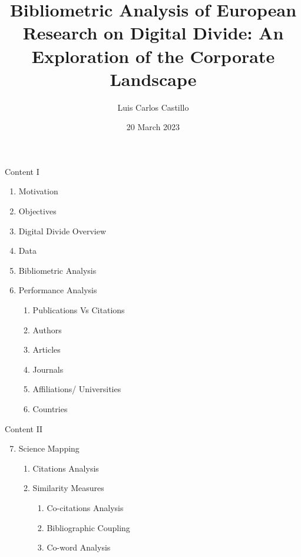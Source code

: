 \documentclass[
  ignorenonframetext,
]{beamer}
\title{Bibliometric Analysis of European Research on Digital Divide: An
Exploration of the Corporate Landscape}
\author{Luis Carlos Castillo}
\date{20 March 2023}
\institute{University of Urbino\\
Ph.D.~Program in Global Studies}
\providecommand{\tightlist}{%
  \setlength{\itemsep}{0pt}\setlength{\parskip}{0pt}}
\begin{document}
\frame{\titlepage}

\begin{frame}{Content I}
\protect\hypertarget{content-i}{}
\begin{enumerate}
\item
  Motivation
\item
  Objectives
\item
  Digital Divide Overview
\item
  Data
\item
  Bibliometric Analysis
\item
  Performance Analysis

  \begin{enumerate}
  \tightlist
  \item
    Publications Vs Citations
  \item
    Authors
  \item
    Articles
  \item
    Journals
  \item
    Affiliations/ Universities
  \item
    Countries
  \end{enumerate}
\end{enumerate}
\end{frame}

\begin{frame}{Content II}
\protect\hypertarget{content-ii}{}
\begin{enumerate}
\setcounter{enumi}{6}
\item
  Science Mapping

  \begin{enumerate}
  \tightlist
  \item
    Citations Analysis
  \item
    Similarity Measures

    \begin{enumerate}
    \tightlist
    \item
      Co-citations Analysis
    \item
      Bibliographic Coupling
    \item
      Co-word Analysis
    \end{enumerate}
  \end{enumerate}
\end{enumerate}
\end{frame}
\end{document}
